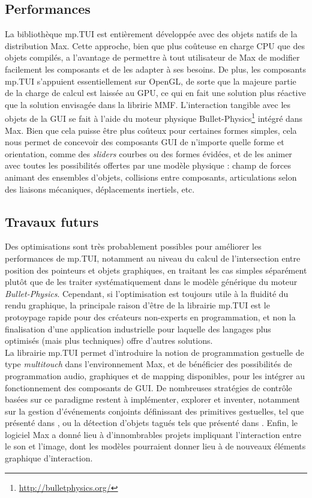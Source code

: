 \subsection{Performances}

\noindent La bibliothèque mp.TUI est entièrement développée avec des objets natifs de la distribution Max. Cette approche, bien que plus coûteuse en charge \gls{CPU} que des objets compilés, a l'avantage de permettre à tout utilisateur de Max de modifier facilement les composants et de les adapter à ses besoins. De plus, les composants mp.TUI s'appuient essentiellement sur OpenGL, de sorte que la majeure partie de la charge de calcul est laissée au \gls{GPU}, ce qui en fait une solution plus réactive que la solution envisagée dans la libririe MMF. L'interaction tangible avec les objets de la \gls{GUI} se fait à l'aide du moteur physique Bullet-Physics\footnote{\url{http://bulletphysics.org/}} intégré dans Max. Bien que cela puisse être plus coûteux pour certaines formes simples, cela nous permet de concevoir des composants \gls{GUI} de n'importe quelle forme et orientation, comme des \textit{sliders} courbes ou des formes évidées, et de les animer avec toutes les possibilités offertes par une modèle physique : champ de forces animant des ensembles d'objets, collisions entre composants, articulations selon des liaisons mécaniques, déplacements inertiels, etc.

\subsection{Travaux futurs}

\noindent Des optimisations sont très probablement possibles pour améliorer les performances de mp.TUI, notamment au niveau du calcul de l'intersection entre position des pointeurs et objets graphiques, en traitant les cas simples séparément plutôt que de les traiter systématiquement dans le modèle générique du moteur \textit{Bullet-Physics}. Cependant, si l'optimisation est toujours utile à la fluidité du rendu graphique, la principale raison d'être de la librairie mp.TUI est le protoypage rapide pour des créateurs non-experts en programmation, et non la finalisation d'une application industrielle pour laquelle des langages plus optimisés (mais plus techniques) offre d'autres solutions.\\
\noindent La librairie mp.TUI permet d'introduire la notion de programmation gestuelle de type \textit{multitouch} dans l'environnement Max, et de bénéficier des possibilités de programmation audio, graphiques et de mapping disponibles, pour les intégrer au fonctionnement des composants de \gls{GUI}. De nombreuses stratégies de contrôle basées sur ce paradigme restent à implémenter, explorer et inventer, notamment sur la gestion d'événements conjoints définissant des primitives gestuelles, tel que présenté dans \cite{oney_implementing_2019}, ou la détection d'objets tagués tels que présenté dans \cite{yu_tuic_2011}. Enfin, le logiciel Max a donné lieu à d'innombrables projets impliquant l'interaction entre le son et l'image, dont les modèles pourraient donner lieu à de nouveaux éléments graphique d'interaction.


